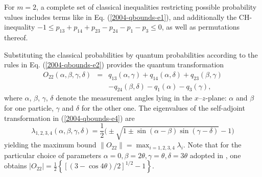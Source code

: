 \documentclass[prl,showpacs,showkeys,amsfonts,amsmath,twocolumn]{revtex4}
\begin{document}
For $m=2$, a complete
set of classical inequalities restricting possible probability values includes terms
like in Eq. (\ref{2004-qbounds-e1}),
and additionally the CH-inequality
$-1 \leq p_{13} + p_{14} + p_{23} - p_{24}- p_{1} -p_{3} \leq 0$, as well as permutations thereof.

Substituting
the classical probabilities by quantum probabilities according to the
rules in Eq. (\ref{2004-qbounds-e2}) provides the quantum
transformation
\begin{eqnarray}
O_{22}(\alpha,\beta,\gamma,\delta)&=&  q_{13}(\alpha,\gamma) +
q_{14}(\alpha,\delta) + q_{23}(\beta,\gamma) \nonumber\\
&&  - q_{24}(\beta,\delta)- q_{1}(\alpha) - q_{3}(\gamma),
\label{2004-qbounds-e4}
\end{eqnarray}
where $\alpha$, $\beta$, $\gamma$, $\delta$ denote the measurement angles
lying in the $x$--$z$-plane: $\alpha$ and $\beta$ for one particle, $\gamma$ and
$\delta$ for the other one.
The eigenvalues of the self-adjoint transformation in
(\ref{2004-qbounds-e4}) are
\begin{equation}
  \label{eq:2004-qbounds-evo22}
  \lambda_{1,2,3,4}(\alpha,\beta,\gamma,\delta )
=
\frac{1}{2}\big(\pm\sqrt{1\pm\sin(\alpha -\beta )\sin(\gamma -\delta )}-1\big)
\end{equation}
yielding the maximum bound
$\|O_{22} \|= \max_{i=1,2,3,4} \lambda_i$.
Note that for the particular choice of parameters
$\alpha=0,\beta=2\theta,\gamma=\theta,\delta=3\theta$ adopted in
\cite{cabello-2003a,filipp-svo-04-qpoly}, one obtains $|O_{22}|=
\frac{1}{2}\left\{\left[ \left(3-\cos 4\theta \right)/2\right]^{1/2}
  -1\right\}$.
\end{document}
